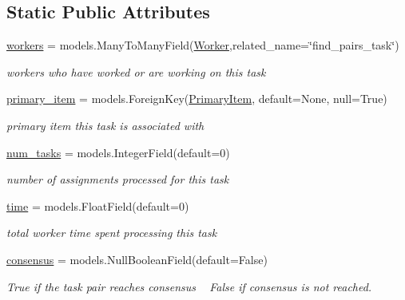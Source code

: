 \subsection*{Static Public Attributes}
\begin{DoxyCompactItemize}
\item 
\mbox{\hyperlink{classjoinapp_1_1models_1_1task__management__models_1_1_find_pairs_task_a42a0cd7f4a34b940f08fd182458c9aba}{workers}} = models.\+Many\+To\+Many\+Field(\mbox{\hyperlink{classjoinapp_1_1models_1_1task__management__models_1_1_worker}{Worker}},related\+\_\+name=\char`\"{}find\+\_\+pairs\+\_\+task\char`\"{})
\begin{DoxyCompactList}\small\item\em workers who have worked or are working on this task \end{DoxyCompactList}\item 
\mbox{\hyperlink{classjoinapp_1_1models_1_1task__management__models_1_1_find_pairs_task_aba1ada8f72cc448a543f1b01551172fa}{primary\+\_\+item}} = models.\+Foreign\+Key(\textquotesingle{}\mbox{\hyperlink{classjoinapp_1_1models_1_1items_1_1_primary_item}{Primary\+Item}}\textquotesingle{}, default=None, null=True)
\begin{DoxyCompactList}\small\item\em primary item this task is associated with \end{DoxyCompactList}\item 
\mbox{\hyperlink{classjoinapp_1_1models_1_1task__management__models_1_1_find_pairs_task_afc259a6f918180e978f96108b03d3411}{num\+\_\+tasks}} = models.\+Integer\+Field(default=0)
\begin{DoxyCompactList}\small\item\em number of assignments processed for this task \end{DoxyCompactList}\item 
\mbox{\hyperlink{classjoinapp_1_1models_1_1task__management__models_1_1_find_pairs_task_a70c092a6aebace0b1ea406e14da78a40}{time}} = models.\+Float\+Field(default=0)
\begin{DoxyCompactList}\small\item\em total worker time spent processing this task \end{DoxyCompactList}\item 
\mbox{\hyperlink{classjoinapp_1_1models_1_1task__management__models_1_1_find_pairs_task_acd4d1b3226891bb64f1fb71cff3a390e}{consensus}} = models.\+Null\+Boolean\+Field(default=False)
\begin{DoxyCompactList}\small\item\em True if the task pair reaches consensus ~\newline
 False if consensus is not reached. \end{DoxyCompactList}\end{DoxyCompactItemize}



